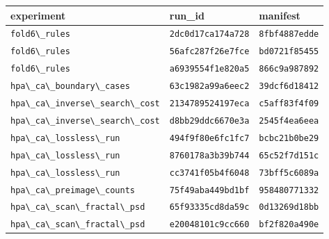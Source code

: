 \begin{tabular}{lll}%
\hline%
\textbf{experiment}&\textbf{run\_id}&\textbf{manifest}\\%
\hline%
\texttt{fold6\textbackslash{}\_rules}&\texttt{2dc0d17ca174a728}&\texttt{8fbf4887edde}\\%
\texttt{fold6\textbackslash{}\_rules}&\texttt{56afc287f26e7fce}&\texttt{bd0721f85455}\\%
\texttt{fold6\textbackslash{}\_rules}&\texttt{a6939554f1e820a5}&\texttt{866c9a987892}\\%
\texttt{hpa\textbackslash{}\_ca\textbackslash{}\_boundary\textbackslash{}\_cases}&\texttt{63c1982a99a6eec2}&\texttt{39dcf6d18412}\\%
\texttt{hpa\textbackslash{}\_ca\textbackslash{}\_inverse\textbackslash{}\_search\textbackslash{}\_cost}&\texttt{2134789524197eca}&\texttt{c5aff83f4f09}\\%
\texttt{hpa\textbackslash{}\_ca\textbackslash{}\_inverse\textbackslash{}\_search\textbackslash{}\_cost}&\texttt{d8bb29ddc6670e3a}&\texttt{2545f4ea6eea}\\%
\texttt{hpa\textbackslash{}\_ca\textbackslash{}\_lossless\textbackslash{}\_run}&\texttt{494f9f80e6fc1fc7}&\texttt{bcbc21b0be29}\\%
\texttt{hpa\textbackslash{}\_ca\textbackslash{}\_lossless\textbackslash{}\_run}&\texttt{8760178a3b39b744}&\texttt{65c52f7d151c}\\%
\texttt{hpa\textbackslash{}\_ca\textbackslash{}\_lossless\textbackslash{}\_run}&\texttt{cc3741f05b4f6048}&\texttt{73bff5c6089a}\\%
\texttt{hpa\textbackslash{}\_ca\textbackslash{}\_preimage\textbackslash{}\_counts}&\texttt{75f49aba449bd1bf}&\texttt{958480771332}\\%
\texttt{hpa\textbackslash{}\_ca\textbackslash{}\_scan\textbackslash{}\_fractal\textbackslash{}\_psd}&\texttt{65f93335cd8da59c}&\texttt{0d13269d18bb}\\%
\texttt{hpa\textbackslash{}\_ca\textbackslash{}\_scan\textbackslash{}\_fractal\textbackslash{}\_psd}&\texttt{e20048101c9cc660}&\texttt{bf2f820a490e}\\%
\hline%
\end{tabular}
